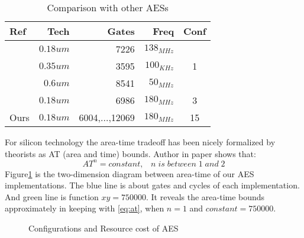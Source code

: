 \begin{table}[h]
\centering
\caption{Comparison with other AESs}
\begin{tabular}{|l|r|r|r|c|}\hline
Ref & Tech & Gates & Freq & Conf \\ \hline
\cite{Akashi:AES} & $0.18um$ & 7226 & $138_{MHz}$ &  \\ \cline{1-4}
\cite{Martin:AES} & $0.35um$ & 3595 & $100_{KHz}$ & 1\\ \cline{1-4}
\cite{Norbert:AES} & $0.6um$ & 8541 & $50_{MHz}$ & \\ \hline
\cite{Yibo:AES} & $0.18um$ & 6986 & $180_{MHz}$ & 3 \\ \hline
Ours & $0.18um$ & 6004,...,12069 & $180_{MHz}$ & 15 \\ \hline
\end{tabular}
\label{table:com}
\end{table} 
For silicon technology the area-time tradeoff has been nicely formalized by theorists as AT (area and time) bounds. Author in paper\cite{AT} shows that: 
\begin{equation}
AT^n = constant, \;\;\;n\; is\; between\; 1\; and\; 2
\label{eq:at}
\end{equation} 
Figure\ref{fig-mesure} is the two-dimension diagram between area-time of our AES implementations. The blue line is about gates and cycles of each implementation. And green line is function $xy=750000$. It reveals the area-time bounds approximately in keeping with \eqref{eq:at}, when $n=1$ and $constant = 750000$.
\begin{figure}[thbp]
\centering
{}
\caption{Configurations and Resource cost of AES}
\label{fig-mesure}
\end{figure}
